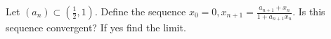 Let $(a_n)\subset (\frac{1}{2},1)$. Define the sequence $x_0=0,\displaystyle x_{n+1}=\frac{a_{n+1}+x_n}{1+a_{n+1}x_n}$. Is this sequence convergent? If yes find the limit.